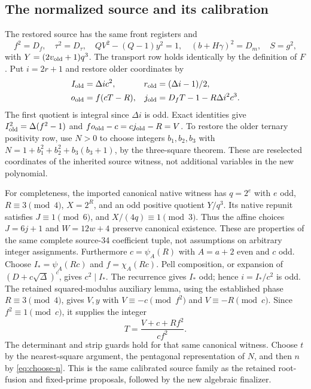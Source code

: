 \subsection{The normalized source and its calibration}
The restored source has the same front registers and
\[
 f^2=D_f,\quad\tau^2=D_\tau,\quad QV^2-(Q-1)y^2=1,\quad
 (b+H\gamma)^2=D_m,\quad S=g^2,
\]
with $Y=(2v_{\rm old}+1)q^3$. The transport row holds identically
by the definition of $F$. Put $i=2r+1$ and restore older coordinates by
\begin{align*}
 I_{\rm old}&=\Delta i c^2,&r_{\rm old}&=(\Delta i-1)/2,\\
 o_{\rm old}&=f(cT-R),&j_{\rm old}&=D_fT-1-R\Delta i^2c^3.
\end{align*}
The first quotient is integral since $\Delta i$ is odd. Exact identities
give $I_{\rm old}^2=\Delta(f^2-1)$ and
$fo_{\rm old}-c=cj_{\rm old}-R=V$.
To restore the older ternary positivity row, use $N>0$ to choose
integers $b_1,b_2,b_3$ with
$N=1+b_1^2+b_2^2+b_3(b_3+1)$, by the three-square theorem.
These are reselected coordinates of the inherited source witness, not
additional variables in the new polynomial.

For completeness, the imported canonical native witness has
$q=2^e$ with $e$ odd, $R\equiv3\pmod4$, $X=2^R$, and an odd positive
quotient $Y/q^3$. Its native repunit satisfies $J\equiv1\pmod6$, and
$X/(4q)\equiv1\pmod3$. Thus the affine choices $J=6j+1$ and
$W=12w+4$ preserve canonical existence. These are properties of the
same complete source-34 coefficient tuple, not assumptions on arbitrary
integer assignments. Furthermore $c=\psi_A(R)$ with $A=a+2$ even
and $c$ odd. Choose
$I_*=\psi_A(Rc)$ and $f=\chi_A(Rc)$.
Pell composition, or expansion of $(D+c\sqrt\Delta)^c$, gives
$c^2\mid I_*$. The recurrence gives $I_*$ odd; hence $i=I_*/c^2$ is odd.
The retained squared-modulus auxiliary lemma, using the established
phase $R\equiv3\pmod4$, gives $V,y$ with
$V\equiv-c\pmod{f^2}$ and $V\equiv-R\pmod c$. Since
$f^2\equiv1\pmod c$, it supplies the integer
\[
 T=\frac{V+c+Rf^2}{cf^2}.
\]
The determinant and strip guards hold for that same canonical witness.
Choose $t$ by the nearest-square argument, the pentagonal representation
of $N$, and then $n$ by \eqref{eq:choose-n}.
This is the same calibrated source family as the retained root-fusion and
fixed-prime proposals, followed by the new algebraic finalizer.

